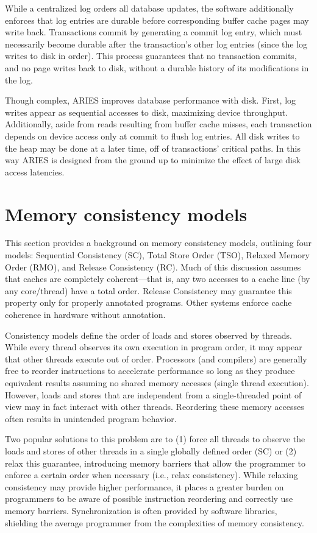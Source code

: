 While a centralized log orders all database updates, the software additionally enforces that log entries are durable before corresponding buffer cache pages may write back.
Transactions commit by generating a commit log entry, which must necessarily become durable after the transaction's other log entries (since the log writes to disk in order).
This process guarantees that no transaction commits, and no page writes back to disk, without a durable history of its modifications in the log.

Though complex, ARIES improves database performance with disk.
First, log writes appear as sequential accesses to disk, maximizing device throughput.
Additionally, aside from reads resulting from buffer cache misses, each transaction depends on device access only at commit to flush log entries.
All disk writes to the heap may be done at a later time, off of transactions' critical paths.
In this way ARIES is designed from the ground up to minimize the effect of large disk access latencies.

\section{Memory consistency models}
\label{sec:Background:MemoryConsistency}

This section provides a background on memory consistency models, outlining four models: Sequential Consistency (SC), Total Store Order (TSO), Relaxed Memory Order (RMO), and Release Consistency (RC).
Much of this discussion assumes that caches are completely coherent---that is, any two accesses to a cache line (by any core/thread) have a total order.
Release Consistency may guarantee this property only for properly annotated programs.
Other systems enforce cache coherence in hardware without annotation.

Consistency models define the order of loads and stores observed by threads.
While every thread observes its own execution in program order, it may appear that other threads execute out of order.
Processors (and compilers) are generally free to reorder instructions to accelerate performance so long as they produce equivalent results assuming no shared memory accesses (single thread execution).
However, loads and stores that are independent from a single-threaded point of view may in fact interact with other threads.
Reordering these memory accesses often results in unintended program behavior.

Two popular solutions to this problem are to (1) force all threads to observe the loads and stores of other threads in a single globally defined order (SC) or (2) relax this guarantee, introducing memory barriers that allow the programmer to enforce a certain order when necessary (i.e., relax consistency).
While relaxing consistency may provide higher performance, it places a greater burden on programmers to be aware of possible instruction reordering and correctly use memory barriers.
Synchronization is often provided by software libraries, shielding the average programmer from the complexities of memory consistency.

